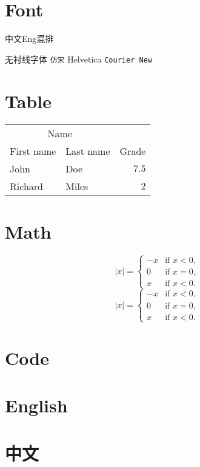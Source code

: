 \section{Font}
中文Eng混排\par
\textsf{无衬线字体} \texttt{仿宋} \textsf{Helvetica} \texttt{Courier New}\\
\section{Table}
\begin{table}[H]
    \centering
    \begin{tabular}{llr}
        \toprule
        \multicolumn{2}{c}{Name} \\
        \cmidrule(r){1-2}
        First name & Last name & Grade \\
        \midrule
        John & Doe & $7.5$ \\
        \midrule
        Richard & Miles & $2$\\
        \bottomrule
    \end{tabular}
\end{table}
\section{Math}
\[ |x| = \left\{\begin{array}{rl}
    -x & \text{if }x<0,\\
    0 & \text{if }x=0,\\
    x & \text{if }x<0.
    \end{array} \right. \]
    \[ |x| = \begin{cases}
    -x & \text{if }x<0,\\
    0 & \text{if }x=0,\\
    x & \text{if }x<0.
    \end{cases} \]
\section{Code}

\section{English}
\lipsum[1-3]
\section{中文}
\zhlipsum[3-4]